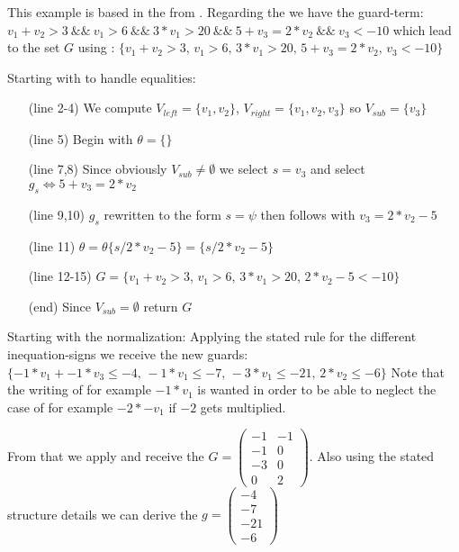 \begin{example}
	\label{ex:derivation-guard}
	This example is based in the \its  from .
	Regarding the \its we have the guard-term:\newline
	\hspace*{2cm}$v_1 + v_2 > 3 \>\&\&\> v_1 > 6 \>\&\&\> 3 * v_1 > 20 \>\&\&\> 5 + v_3 = 2 * v_2 \>\&\&\> v_3 < -10$\newline
	which lead to the set $G$ using :\newline
	\hspace*{2cm}$\{v_1 + v_2 > 3\text{, } v_1 > 6 \text{, } 3 * v_1 > 20 \text{, } 5 + v_3 = 2 * v_2 \text{, } v_3 < -10\}$\newline	
	
	Starting with  to handle equalities:
	\begin{enumerate}
		\setlength{\itemindent}{1in}
		\item[(line 2-4)] We compute $V_{left}=\{v_1, v_2\}$, $V_{right}=\{v_1,v_2,v_3\}$ so $V_{sub}=\{v_3\}$
		\item[(line 5)] Begin with $\theta=\{\}$ 
		\item[(line 7,8)] Since obviously $V_{sub} \neq \emptyset$  we select $s=v_3$ and select $g_s \Leftrightarrow 5+v_3=2*v_2$
		\item[(line 9,10)] $g_s$ rewritten to the form $s=\psi$ then follows with $v_3=2*v_2-5$
		\item[(line 11)] $\theta = \theta\{s/2*v_2-5\} = \{s/2*v_2-5\}$
		\item[(line 12-15)] $G=\{v_1 + v_2 > 3$, $ v_1 > 6 $, $ 3 * v_1 > 20 $, $ 2*v_2-5 < -10\}$
		\item[(end)] Since $V_{sub}=\emptyset$ return $G$
	\end{enumerate}
	
	Starting with the normalization:\newline
	Applying the stated rule for the different inequation-signs we receive the new guards:\newline
	\hspace*{1cm}$\{-1*v_1+-1*v_3 \le -4\text{, } -1*v_1 \le -7 \text{, } -3*v_1 \le -21\text{, } 2*v_2\le -6\}$\newline
	Note that the writing of for example $-1*v_1$ is wanted in order to be able to neglect the case of for example $-2*-v_1$ if $-2$ gets multiplied.
	
	From that we apply  and receive the \guardmatrix  $G = \begin{pmatrix} -1 & -1 \\ -1 & 0 \\ -3 & 0 \\ 0 & 2 \end{pmatrix}$. Also using the stated structure details we can derive the \guardconstants $g= \begin{pmatrix} -4 \\ -7 \\ -21 \\ -6 \end{pmatrix}$
\end{example}

